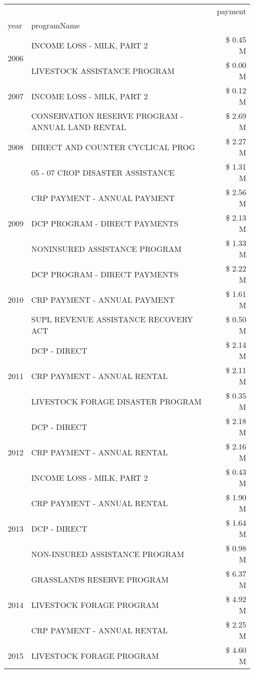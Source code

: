 \begin{tabular}{llr}
\toprule
 &  & payment \\
year & programName &  \\
\midrule
\multirow[t]{2}{*}{2006} & INCOME LOSS - MILK, PART 2 & \$ 0.45 M \\
 & LIVESTOCK ASSISTANCE PROGRAM & \$ 0.00 M \\
\cline{1-3}
2007 & INCOME LOSS - MILK, PART 2 & \$ 0.12 M \\
\cline{1-3}
\multirow[t]{3}{*}{2008} & CONSERVATION RESERVE PROGRAM - ANNUAL LAND RENTAL & \$ 2.69 M \\
 & DIRECT AND COUNTER CYCLICAL PROG & \$ 2.27 M \\
 & 05 - 07 CROP DISASTER ASSISTANCE & \$ 1.31 M \\
\cline{1-3}
\multirow[t]{3}{*}{2009} & CRP PAYMENT - ANNUAL PAYMENT & \$ 2.56 M \\
 & DCP PROGRAM - DIRECT PAYMENTS & \$ 2.13 M \\
 & NONINSURED ASSISTANCE PROGRAM & \$ 1.33 M \\
\cline{1-3}
\multirow[t]{3}{*}{2010} & DCP PROGRAM - DIRECT PAYMENTS & \$ 2.22 M \\
 & CRP PAYMENT - ANNUAL PAYMENT & \$ 1.61 M \\
 & SUPL REVENUE ASSISTANCE RECOVERY ACT & \$ 0.50 M \\
\cline{1-3}
\multirow[t]{3}{*}{2011} & DCP - DIRECT & \$ 2.14 M \\
 & CRP PAYMENT - ANNUAL RENTAL & \$ 2.11 M \\
 & LIVESTOCK FORAGE DISASTER PROGRAM & \$ 0.35 M \\
\cline{1-3}
\multirow[t]{3}{*}{2012} & DCP - DIRECT & \$ 2.18 M \\
 & CRP PAYMENT - ANNUAL RENTAL & \$ 2.16 M \\
 & INCOME LOSS - MILK, PART 2 & \$ 0.43 M \\
\cline{1-3}
\multirow[t]{3}{*}{2013} & CRP PAYMENT - ANNUAL RENTAL & \$ 1.90 M \\
 & DCP - DIRECT & \$ 1.64 M \\
 & NON-INSURED ASSISTANCE PROGRAM & \$ 0.98 M \\
\cline{1-3}
\multirow[t]{3}{*}{2014} & GRASSLANDS RESERVE PROGRAM & \$ 6.37 M \\
 & LIVESTOCK FORAGE PROGRAM & \$ 4.92 M \\
 & CRP PAYMENT - ANNUAL RENTAL & \$ 2.25 M \\
\cline{1-3}
\multirow[t]{3}{*}{2015} & LIVESTOCK FORAGE PROGRAM & \$ 4.60 M \\

\end{tabular}
